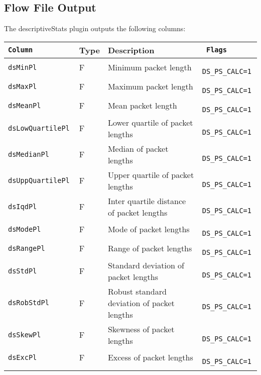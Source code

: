 \documentclass[documentation]{subfiles}
\begin{document}
\subsection{Flow File Output}
The descriptiveStats plugin outputs the following columns:
\begin{longtable}{>{\tt}lll>{\tt\small}l}
    \toprule
    {\bf Column} & {\bf Type} & {\bf Description} & {\bf Flags}\\
    \midrule\endhead%
    dsMinPl          & F & Minimum packet length                            & DS\_PS\_CALC=1\\
    dsMaxPl          & F & Maximum packet length                            & DS\_PS\_CALC=1\\
    dsMeanPl         & F & Mean packet length                               & DS\_PS\_CALC=1\\
    dsLowQuartilePl  & F & Lower quartile of packet lengths                 & DS\_PS\_CALC=1\\
    dsMedianPl       & F & Median of packet lengths                         & DS\_PS\_CALC=1\\
    dsUppQuartilePl  & F & Upper quartile of packet lengths                 & DS\_PS\_CALC=1\\
    dsIqdPl          & F & Inter quartile distance of packet lengths        & DS\_PS\_CALC=1\\
    dsModePl         & F & Mode of packet lengths                           & DS\_PS\_CALC=1\\
    dsRangePl        & F & Range of packet lengths                          & DS\_PS\_CALC=1\\
    dsStdPl          & F & Standard deviation of packet lengths             & DS\_PS\_CALC=1\\
    dsRobStdPl       & F & Robust standard deviation of packet lengths      & DS\_PS\_CALC=1\\
    dsSkewPl         & F & Skewness of packet lengths                       & DS\_PS\_CALC=1\\
    dsExcPl          & F & Excess of packet lengths                         & DS\_PS\_CALC=1\\
    \\

\end{longtable}
\end{document}
